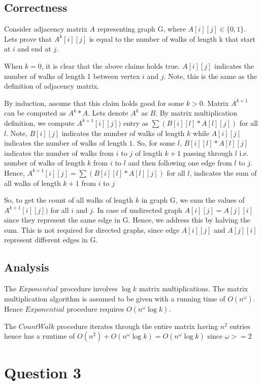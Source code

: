 \documentclass{article}
\begin{document}
\subsection*{Correctness}
Consider adjacency matrix $A$ representing graph G, where \(A[i][j] \in \{0, 1\}\). Lets prove that \(A^k[i][j]\) is equal to the number of walks of length k that start at \(i\) and end at \(j\).

When \(k = 0\), it is clear that the above claims holds true. $A[i][j]$ indicates the number of walks of length 1 between vertex $i$ and $j$. Note, this is the same as the definition of adjacency matrix.

By induction, assume that this claim holds good for some \(k > 0\). Matrix \(A^{k+1}\) can be computed as \(A^k*A\). Lets denote \(A^k\) as \(B\). By matrix multiplication definition, we compute \(A^{k+1}[i][j])\) entry as \(\sum(B[i][l]*A[l][j])\) for all \(l\). Note, \(B[i][j]\) indicates the number of walks of length \(k\) while \(A[i][j]\) indicates the number of walks of length \(1\). So, for some \(l\), \(B[i][l]*A[l][j]\) indicates the number of walks from \(i\) to \(j\) of length \(k+1\) passing through $l$ i.e. number of walks of length \(k\) from \(i\) to \(l\) and then following one edge from \(l\) to \(j\). Hence, \(A^{k+1}[i][j] = \sum(B[i][l]*A[l][j])\) for all \(l\), indicates the sum of all walks of length \(k+1\) from \(i\) to \(j\)

So, to get the count of all walks of length \(k\) in graph G, we sum the values of \(A^{k+1}[i][j])\) for all \(i\) and \(j\). In case of undirected graph \(A[i][j] = A[j][i]\) since they represent the same edge in G. Hence, we address this by halving the sum. This is not required for directed graphs, since edge \(A[i][j]\) and \(A[j][i]\) represent different edges in G.

\subsection*{Analysis}
The \(Exponential\) procedure involves \(\log k\) matrix multiplications. The matrix multiplication algorithm is assumed to be given with a running time of \(O(n^\omega)\). Hence \(Exponential\) procedure requires \(O(n^\omega \log k)\).

The \(CountWalk\) procedure iterates through the entire matrix having \(n^2\) entries hence has a runtime of \(O(n^2) + O(n^\omega \log k) = O(n^\omega \log k)\) since \(\omega >= 2\)

\section*{Question 3}
\end{document}
